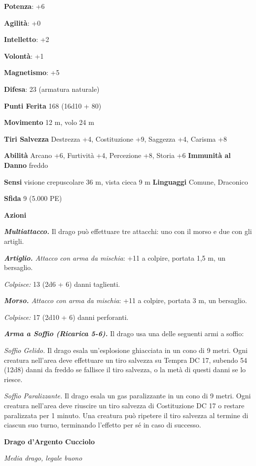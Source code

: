 \begin{multicols}{2}
\textbf{Potenza}: +6

\textbf{Agilità}: +0

\textbf{Intelletto}: +2

\textbf{Volontà}: +1

\textbf{Magnetismo}: +5

\textbf{Difesa}: 23 (armatura naturale)

\textbf{Punti Ferita} 168 (16d10 + 80)

\textbf{Movimento} 12 m, volo 24 m

\textbf{Tiri Salvezza} Destrezza +4, Costituzione +9, Saggezza +4,
Carisma +8

\textbf{Abilità} Arcano +6, Furtività +4, Percezione +8, Storia +6
\textbf{Immunità al Danno} freddo

\textbf{Sensi} visione crepuscolare 36 m, vista cieca 9 m
\textbf{Linguaggi} Comune, Draconico

\textbf{Sfida} 9 (5.000 PE)

\textbf{Azioni}

\emph{\textbf{Multiattacco.}} Il drago può effettuare tre attacchi: uno
con il morso e due con gli artigli.

\emph{\textbf{Artiglio.} Attacco con arma da mischia}: +11 a colpire,
portata 1,5 m, un bersaglio.

\emph{Colpisce:} 13 (2d6 + 6) danni taglienti.

\emph{\textbf{Morso.} Attacco con arma da mischia}: +11 a colpire,
portata 3 m, un bersaglio.

\emph{Colpisce:} 17 (2d10 + 6) danni perforanti.

\emph{\textbf{Arma a Soffio (Ricarica 5-6).}} Il drago usa una delle
seguenti armi a soffio:

\emph{Soffio Gelido.} Il drago esala un'esplosione ghiacciata in un cono
di 9 metri. Ogni creatura nell'area deve effettuare un tiro salvezza su Tempra DC 17, subendo 54 (12d8) danni da freddo se fallisce il
tiro salvezza, o la metà di questi danni se lo riesce.

\emph{Soffio Paralizzante.} Il drago esala un gas paralizzante in un
cono di 9 metri. Ogni creatura nell'area deve riuscire un tiro salvezza
di Costituzione DC 17 o restare paralizzata per 1 minuto. Una creatura
può ripetere il tiro salvezza al termine di ciascun suo turno,
terminando l'effetto per sé in caso di successo.

\textbf{Drago d'Argento Cucciolo}

\emph{Media drago, legale buono}


\end{multicols}
